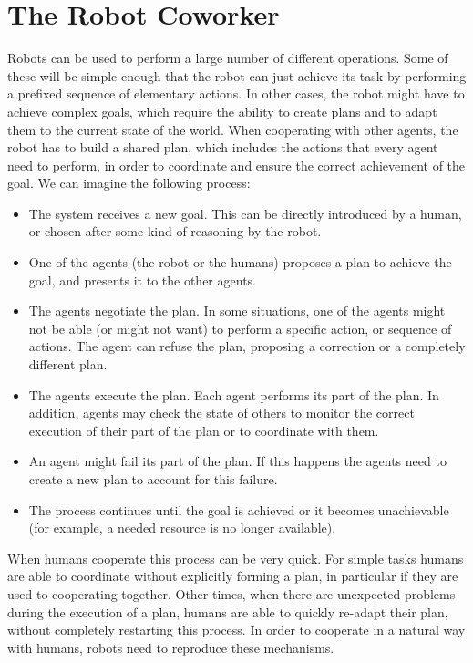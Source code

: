 \part{The Robot Coworker} %

\label{part:robot_coworker} %


Robots can be used to perform a large number of different operations. Some of these will be simple enough that the robot can just achieve its task by performing a prefixed sequence of elementary actions. In other cases, the robot might have to achieve complex goals, which require the ability to create plans and to adapt them to the current state of the world. When cooperating with other agents, the robot has to build a shared plan, which includes the actions that every agent need to perform, in order to coordinate and ensure the correct achievement of the goal. We can imagine the following process:
\begin{itemize}
	\item The system receives a new goal. This can be directly introduced by a human, or chosen after some kind of reasoning by the robot.
	\item One of the agents (the robot or the humans) proposes a plan to achieve the goal, and presents it to the other agents.
	\item The agents negotiate the plan. In some situations, one of the agents might not be able (or might not want) to perform a specific action, or sequence of actions. The agent can refuse the plan, proposing a correction or a completely different plan.
	\item The agents execute the plan. Each agent performs its part of the plan. In addition, agents may check the state of others to monitor the correct execution of their part of the plan or to coordinate with them.
	\item An agent might fail its part of the plan. If this happens the agents need to create a new plan to account for this failure.
 	\item The process continues until the goal is achieved or it becomes unachievable (for example, a needed resource is no longer available).
\end{itemize}

When humans cooperate this process can be very quick. For simple tasks humans are able to coordinate without explicitly forming a plan, in particular if they are used to cooperating together. Other times, when there are unexpected problems during the execution of a plan, humans are able to quickly re-adapt their plan, without completely restarting this process. In order to cooperate in a natural way with humans, robots need to reproduce these mechanisms.

